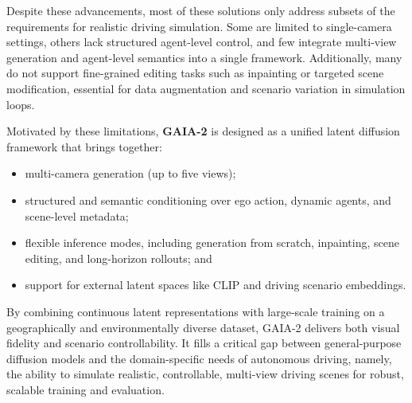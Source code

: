 Despite these advancements, most of these solutions only address subsets of the requirements for realistic driving simulation. Some are limited to single-camera settings, others lack structured agent-level control, and few integrate multi-view generation and agent-level semantics into a single framework. Additionally, many do not support fine-grained editing tasks such as inpainting or targeted scene modification, essential for data augmentation and scenario variation in simulation loops.

Motivated by these limitations, \textbf{GAIA-2} is designed as a unified latent diffusion framework that brings together: 
\begin{itemize}
    \item multi-camera generation (up to five views); 
    \item structured and semantic conditioning over ego action, dynamic agents, and scene-level metadata; 
    \item flexible inference modes, including generation from scratch, inpainting, scene editing, and long-horizon rollouts; and 
    \item support for external latent spaces like CLIP and driving scenario embeddings.
\end{itemize} 
By combining continuous latent representations with large-scale training on a geographically and environmentally diverse dataset, GAIA-2 delivers both visual fidelity and scenario controllability. It fills a critical gap between general-purpose diffusion models and the domain-specific needs of autonomous driving, namely, the ability to simulate realistic, controllable, multi-view driving scenes for robust, scalable training and evaluation.
